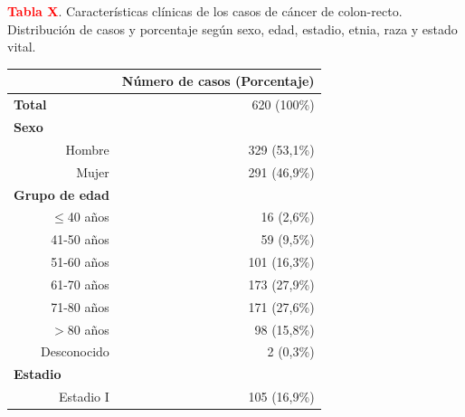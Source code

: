 \newpage
\textbf{\textcolor{red}{Tabla X}}. Características clínicas de los casos de cáncer de colon-recto. Distribución de casos y porcentaje según sexo, edad, estadio, etnia, raza y estado vital.

\begin{table}[H]
		\centering
	\begin{tabular}{rr}
		\cline{2-2}
		\multicolumn{1}{l}{}                       & \multicolumn{1}{c}{\textbf{Número de casos (Porcentaje)}} \\ \hline
		\multicolumn{1}{l}{\textbf{Total}}         & 620 (100\%)                                               \\ \hline
		\multicolumn{1}{l}{\textbf{Sexo}}          &                                                           \\
		Hombre                                     & 329 (53,1\%)                                              \\
		Mujer                                      & 291 (46,9\%)                                              \\ \hline
		\multicolumn{1}{l}{\textbf{Grupo de edad}} &                                                           \\
		$\leq$40 años                                   & 16 (2,6\%)                                                \\
		41-50 años                                 & 59 (9,5\%)                                                \\
		51-60 años                                 & 101 (16,3\%)                                              \\
		61-70 años                                 & 173 (27,9\%)                                              \\
		71-80 años                                 & 171 (27,6\%)                                              \\
		$>$80 años                               & 98 (15,8\%)                                               \\
		Desconocido                                & 2 (0,3\%)                                                 \\ \hline
		\multicolumn{1}{l}{\textbf{Estadio}}       &                                                           \\
		Estadio I                                  & 105 (16,9\%)                                              \\

\end{tabular}
\end{table}

